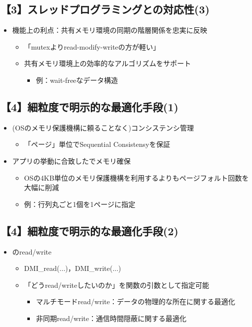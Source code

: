 \documentclass[25pt,landscape,papersize]{jsarticle}
\begin{document}
\subsection{【3】スレッドプログラミングとの対応性(3)}

\begin{itemize}
\item 機能上の利点：共有メモリ環境の同期の階層関係を忠実に反映
  \begin{itemize}
  \item 「mutexよりread-modify-writeの方が軽い」
  \item 共有メモリ環境上の効率的なアルゴリズムをサポート
    \begin{itemize}
    \item 例：wait-freeなデータ構造
    \end{itemize}
  \end{itemize}
\end{itemize}

\subsection{【4】細粒度で明示的な最適化手段(1)}

\begin{itemize}
\item (OSのメモリ保護機構に頼ることなく)コンシステンシ管理
  \begin{itemize}
  \item 「ページ」単位でSequential Consistensyを保証
  \end{itemize}
\item アプリの挙動に合致したでメモリ確保
  \begin{itemize}
  \item OSの4KB単位のメモリ保護機構を利用するよりもページフォルト回数を大幅に削減
  \item 例：行列丸ごと1個を1ページに指定
  \end{itemize}
\end{itemize}

\subsection{【4】細粒度で明示的な最適化手段(2)}

\begin{itemize}
\item {}のread/write
  \begin{itemize}
  \item DMI\_read(...)，DMI\_write(...)
  \item 「どうread/writeしたいのか」を関数の引数として指定可能
    \begin{itemize}
    \item マルチモードread/write：データの物理的な所在に関する最適化
    \item 非同期read/write：通信時間隠蔽に関する最適化
    \end{itemize}
  \end{itemize}
\end{itemize}
\end{document}
